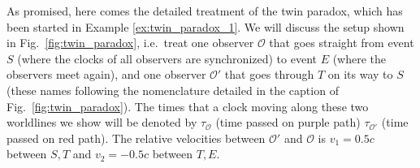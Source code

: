 \documentclass[../relativity_main.tex]{subfiles}
\begin{document}
\begin{ex}\label{ex:twin_paradox_2}
	




	As promised, here comes the detailed treatment of the twin paradox, which has been started in Example \ref{ex:twin_paradox_1}. We will discuss the setup shown in Fig.~\ref{fig:twin_paradox}, i.e.~treat one observer $\mathcal{O}$ that goes straight from event $S$ (where the clocks of all observers are synchronized) to event $E$ (where the observers meet again), and one observer $\mathcal{O}'$ that goes through $T$ on its way to $S$ (these names following the nomenclature detailed in the caption of Fig.~\ref{fig:twin_paradox}). The times that a clock moving along these two worldlines we show will be denoted by $\tau_{\mathcal{O}}$ (time passed on purple path) $\tau_{\mathcal{O}'}$ (time passed on red path). The relative velocities between $\mathcal{O}'$ and $\mathcal{O}$ is $v_1 = 0.5 c$ between $S, T$ and $v_2 = -0.5 c$ between $T, E$.
	

\end{ex}
\end{document}
